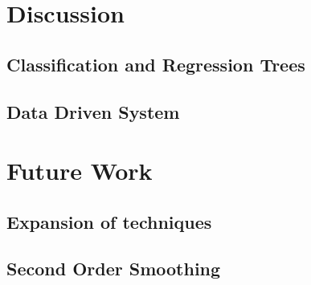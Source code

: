 \documentclass[bsc,frontabs,twoside,singlespacing,parskip]{infthesis}
\begin{document}
\section{Discussion}

\subsection{Classification and Regression Trees}

\subsection{Data Driven System}

\section{Future Work}

\subsection{Expansion of techniques}

\subsection{Second Order Smoothing}
	


\end{document}
